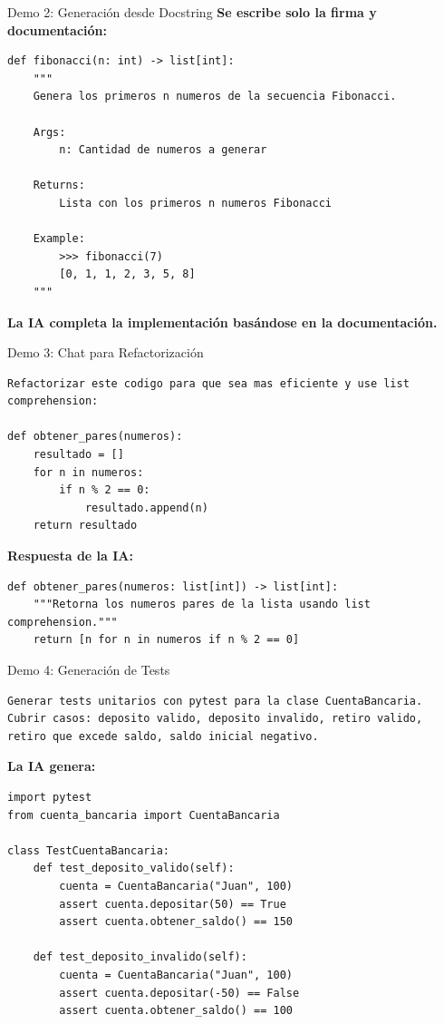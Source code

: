 \documentclass[aspectratio=169]{beamer}
\begin{document}
\begin{frame}[fragile]{Demo 2: Generación desde Docstring}
    \textbf{Se escribe solo la firma y documentación:}
    \begin{lstlisting}
def fibonacci(n: int) -> list[int]:
    """
    Genera los primeros n numeros de la secuencia Fibonacci.
    
    Args:
        n: Cantidad de numeros a generar
        
    Returns:
        Lista con los primeros n numeros Fibonacci
        
    Example:
        >>> fibonacci(7)
        [0, 1, 1, 2, 3, 5, 8]
    """
    \end{lstlisting}
    
    \vspace{0.2cm}
    \textbf{La IA completa la implementación basándose en la documentación.}
\end{frame}

\begin{frame}[fragile]{Demo 3: Chat para Refactorización}
    \begin{lstlisting}[style=promptstyle, title=Prompt en el Chat]
Refactorizar este codigo para que sea mas eficiente y use list comprehension:

def obtener_pares(numeros):
    resultado = []
    for n in numeros:
        if n % 2 == 0:
            resultado.append(n)
    return resultado
    \end{lstlisting}
    
    \vspace{0.2cm}
    \textbf{Respuesta de la IA:}
    \begin{lstlisting}
def obtener_pares(numeros: list[int]) -> list[int]:
    """Retorna los numeros pares de la lista usando list comprehension."""
    return [n for n in numeros if n % 2 == 0]
    \end{lstlisting}
\end{frame}

\begin{frame}[fragile]{Demo 4: Generación de Tests}
    \begin{lstlisting}[style=promptstyle, title=Prompt]
Generar tests unitarios con pytest para la clase CuentaBancaria.
Cubrir casos: deposito valido, deposito invalido, retiro valido, 
retiro que excede saldo, saldo inicial negativo.
    \end{lstlisting}
    
    \vspace{0.2cm}
    \textbf{La IA genera:}
    \begin{lstlisting}[basicstyle=\ttfamily\tiny]
import pytest
from cuenta_bancaria import CuentaBancaria

class TestCuentaBancaria:
    def test_deposito_valido(self):
        cuenta = CuentaBancaria("Juan", 100)
        assert cuenta.depositar(50) == True
        assert cuenta.obtener_saldo() == 150
    
    def test_deposito_invalido(self):
        cuenta = CuentaBancaria("Juan", 100)
        assert cuenta.depositar(-50) == False
        assert cuenta.obtener_saldo() == 100
    \end{lstlisting}
\end{frame}
\end{document}
